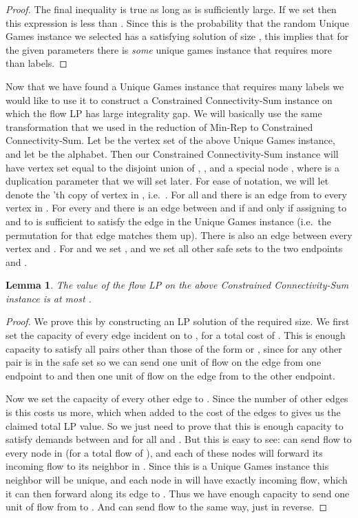 \documentclass[11pt,letterpaper]{article}
\newtheorem{lemma}[theorem]{Lemma}
\theoremstyle{definition}
\newcounter{note}[section]
\begin{document}
\begin{proof}
  

  The final inequality is true as long as  is sufficiently large.  If
  we set  then this expression is
  less than .  Since this is the probability that the random Unique
  Games instance we selected has a satisfying solution of size , this implies that for the given parameters there is \emph{some}
  unique games instance that requires more than  labels.
  \end{proof}

  Now that we have found a Unique Games instance that requires many
  labels we would like to use it to construct a {\sc Constrained
  Connectivity-Sum} instance on which the flow LP has large integrality
  gap.  We will basically use the same transformation that we used in
  the reduction of {\sc Min-Rep} to {\sc Constrained Connectivity-Sum}.  Let
   be the vertex set of the above Unique Games instance, and
  let  be the alphabet.  Then our {\sc Constrained Connectivity-Sum}
  instance will have vertex set  equal to the disjoint union of
  , , and a special node ,
  where  is a duplication parameter that we will set later.  For
  ease of notation, we will let  denote the 'th copy of vertex
   in , i.e.\ .  For all  and  there is an edge from  to every vertex
  in .  For every  and  there is an edge between  and 
  if and only if assigning  to  and  to  is
  sufficient to satisfy the  edge in the Unique Games
  instance (i.e.\ the permutation for that edge matches them up).
  There is also an edge between every vertex and .  For  and  we set , and we set all other
  safe sets to the two endpoints and .

  \begin{lemma} \label{lem:LP_gap} The value of the flow LP on the
    above {\sc Constrained Connectivity-Sum} instance is at most .
  \end{lemma}
  \begin{proof}
    We prove this by constructing an LP solution of the required size.
    We first set the capacity of every edge incident on  to ,
    for a total cost of .  This is
    enough capacity to satisfy all pairs other than those of the form
     or , since for any other pair  is in
    the safe set so we can send one unit of flow on the edge from one
    endpoint to  and then one unit of flow on the edge from  to
    the other endpoint.

    Now we set the capacity of every other edge to .
    Since the number of other edges is  this costs us  more, which when added to the cost of the edges to
     gives us the claimed total LP value.  So we just need to prove
    that this is enough capacity to satisfy demands between  and
     for all  and .  But this is easy to
    see:  can send  flow to every node in  (for a total flow of ), and each of these nodes will
    forward its incoming flow to its neighbor in .
    Since this is a Unique Games instance this neighbor will be
    unique, and each node in  will have exactly  incoming flow, which it can then forward along its edge
    to .  Thus we have enough capacity to send one unit of flow
    from  to .  And  can send flow to  the same
    way, just in reverse.
  \end{proof}
\end{document}
